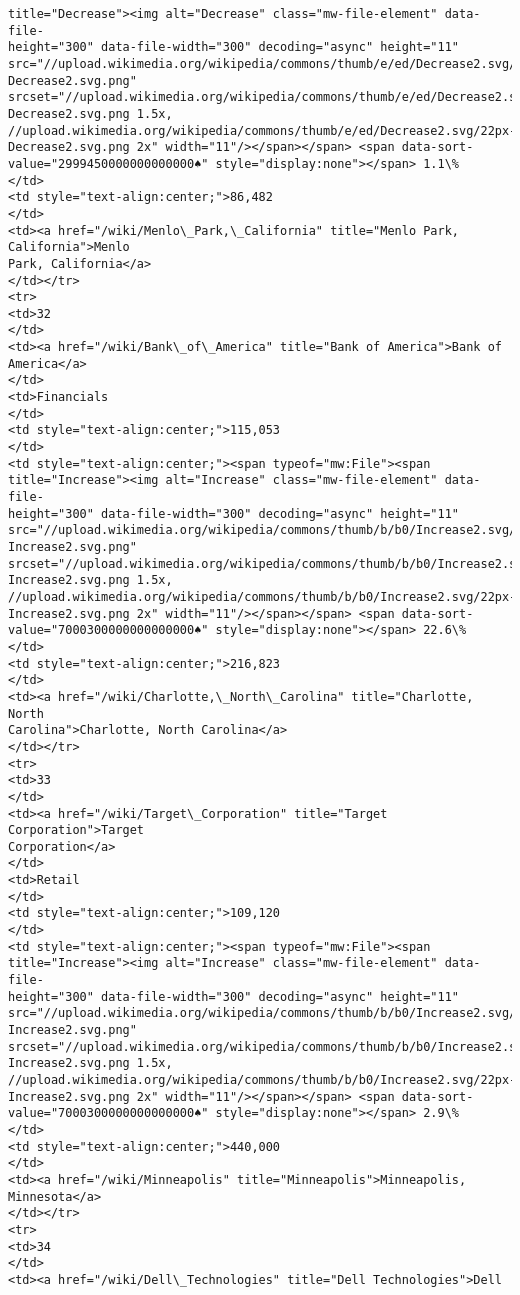 \documentclass[11pt]{article}
\begin{document}
\begin{Verbatim}[commandchars=\\\{\}]
title="Decrease"><img alt="Decrease" class="mw-file-element" data-file-
height="300" data-file-width="300" decoding="async" height="11"
src="//upload.wikimedia.org/wikipedia/commons/thumb/e/ed/Decrease2.svg/11px-
Decrease2.svg.png"
srcset="//upload.wikimedia.org/wikipedia/commons/thumb/e/ed/Decrease2.svg/17px-
Decrease2.svg.png 1.5x,
//upload.wikimedia.org/wikipedia/commons/thumb/e/ed/Decrease2.svg/22px-
Decrease2.svg.png 2x" width="11"/></span></span> <span data-sort-
value="2999450000000000000♠" style="display:none"></span> 1.1\%
</td>
<td style="text-align:center;">86,482
</td>
<td><a href="/wiki/Menlo\_Park,\_California" title="Menlo Park, California">Menlo
Park, California</a>
</td></tr>
<tr>
<td>32
</td>
<td><a href="/wiki/Bank\_of\_America" title="Bank of America">Bank of America</a>
</td>
<td>Financials
</td>
<td style="text-align:center;">115,053
</td>
<td style="text-align:center;"><span typeof="mw:File"><span
title="Increase"><img alt="Increase" class="mw-file-element" data-file-
height="300" data-file-width="300" decoding="async" height="11"
src="//upload.wikimedia.org/wikipedia/commons/thumb/b/b0/Increase2.svg/11px-
Increase2.svg.png"
srcset="//upload.wikimedia.org/wikipedia/commons/thumb/b/b0/Increase2.svg/17px-
Increase2.svg.png 1.5x,
//upload.wikimedia.org/wikipedia/commons/thumb/b/b0/Increase2.svg/22px-
Increase2.svg.png 2x" width="11"/></span></span> <span data-sort-
value="7000300000000000000♠" style="display:none"></span> 22.6\%
</td>
<td style="text-align:center;">216,823
</td>
<td><a href="/wiki/Charlotte,\_North\_Carolina" title="Charlotte, North
Carolina">Charlotte, North Carolina</a>
</td></tr>
<tr>
<td>33
</td>
<td><a href="/wiki/Target\_Corporation" title="Target Corporation">Target
Corporation</a>
</td>
<td>Retail
</td>
<td style="text-align:center;">109,120
</td>
<td style="text-align:center;"><span typeof="mw:File"><span
title="Increase"><img alt="Increase" class="mw-file-element" data-file-
height="300" data-file-width="300" decoding="async" height="11"
src="//upload.wikimedia.org/wikipedia/commons/thumb/b/b0/Increase2.svg/11px-
Increase2.svg.png"
srcset="//upload.wikimedia.org/wikipedia/commons/thumb/b/b0/Increase2.svg/17px-
Increase2.svg.png 1.5x,
//upload.wikimedia.org/wikipedia/commons/thumb/b/b0/Increase2.svg/22px-
Increase2.svg.png 2x" width="11"/></span></span> <span data-sort-
value="7000300000000000000♠" style="display:none"></span> 2.9\%
</td>
<td style="text-align:center;">440,000
</td>
<td><a href="/wiki/Minneapolis" title="Minneapolis">Minneapolis, Minnesota</a>
</td></tr>
<tr>
<td>34
</td>
<td><a href="/wiki/Dell\_Technologies" title="Dell Technologies">Dell

\end{Verbatim}
\end{document}
